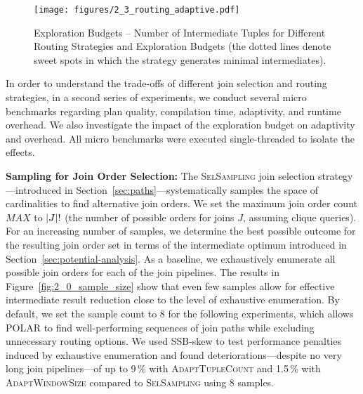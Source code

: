 \begin{figure*}[!t]
    \centering
    \texttt{[image: figures/2\_3\_routing\_adaptive.pdf]}
		\vspace{-0.25cm}
    \caption{Exploration Budgets -- Number of Intermediate Tuples for Different Routing Strategies and Exploration Budgets (the dotted lines denote sweet spots in which the strategy generates minimal intermediates).}
    \label{fig:2_3_routing_adaptive}
		\vspace{-0.2cm}
\end{figure*}

In order to understand the trade-offs of different join selection and routing strategies, in a second series of experiments, we conduct several micro benchmarks regarding plan quality, compilation time, adaptivity, and runtime overhead. We also investigate the impact of the exploration budget on adaptivity and overhead. All micro benchmarks were executed single-threaded to isolate the effects.

\textbf{Sampling for Join Order Selection:} The \textsc{SelSampling} join selection strategy---introduced in Section~\ref{sec:paths}---systematically samples the space of cardinalities to find alternative join orders. We set the maximum join order count ${MAX}$ to $\lvert J\rvert!$ (\ie the number of possible orders for joins $J$, assuming clique queries). For an increasing number of samples, we determine the best possible outcome for the resulting join order set in terms of the intermediate optimum introduced in Section~\ref{sec:potential-analysis}. As a baseline, we exhaustively enumerate all possible join orders for each of the join pipelines. The results in Figure~\ref{fig:2_0_sample_size} show that even few samples allow for effective intermediate result reduction close to the level of exhaustive enumeration. By default, we set the sample count to 8 for the following experiments, which allows POLAR to find well-performing sequences of join paths while excluding unnecessary routing options. We used SSB-skew to test performance penalties induced by exhaustive enumeration and found deteriorations---despite no very long join pipelines---of up to 9\,\% with \textsc{AdaptTupleCount} and 1.5\,\% with \textsc{AdaptWindowSize} compared to \textsc{SelSampling} using 8 samples.

